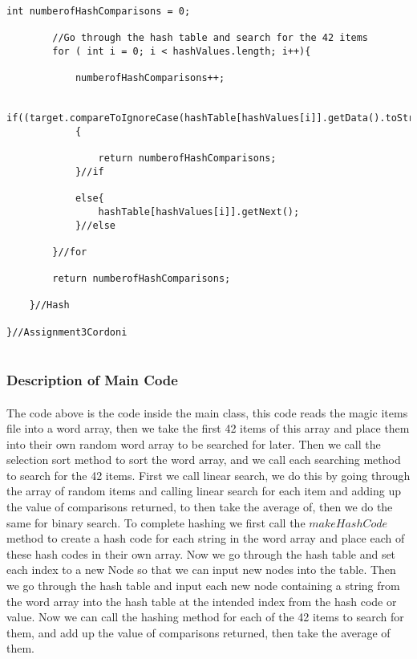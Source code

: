 \documentclass[letterpaper, 10pt,DIV=13]{scrartcl}
\numberwithin{equation}{section} %
\numberwithin{figure}{section} %
\numberwithin{table}{section} %
\begin{document}
\begin{lstlisting}[frame=single, ]
        int numberofHashComparisons = 0;
 
        //Go through the hash table and search for the 42 items
        for ( int i = 0; i < hashValues.length; i++){

            numberofHashComparisons++;

            if((target.compareToIgnoreCase(hashTable[hashValues[i]].getData().toString())!=0))
            {

                return numberofHashComparisons;
            }//if
            
            else{
                hashTable[hashValues[i]].getNext();
            }//else

        }//for

        return numberofHashComparisons;
        
    }//Hash

}//Assignment3Cordoni
       
\end{lstlisting}

\subsubsection{Description of Main Code}
\paragraph{} The code above is the code inside the main class, this code reads the magic items file into a word array, then we take the first 42 items of this array and place them into their own random word array to be searched for later. Then we call the selection sort method to sort the word array, and we call each searching method to search for the 42 items. First we call linear search, we do this by going through the array of random items and calling linear search for each item and adding up the value of comparisons returned, to then take the average of, then we do the same for binary search. To complete hashing we first call the $makeHashCode$ method to create a hash code for each string in the word array and place each of these hash codes in their own array. Now we go through the hash table and set each index to a new Node so that we can input new nodes into the table. Then we go through the hash table and input each new node containing a string from the word array into the hash table at the intended index from the hash code or value. Now we can call the hashing method for each of the 42 items to search for them, and add up the value of comparisons returned, then take the average of them.
\end{document}
